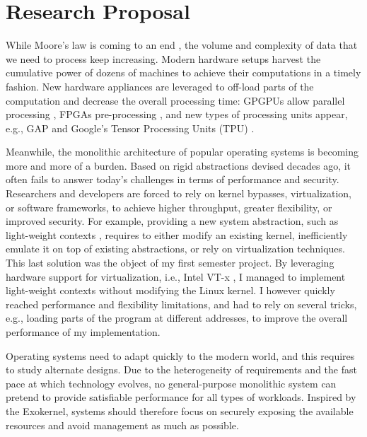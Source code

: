 \section{Research Proposal}

While Moore's law is coming to an end \cite{DBLP:journals/cse/TheisW17,DBLP:journals/computer/DeBenedictis17}, the volume and complexity of data that we need to process keep increasing.
Modern hardware setups harvest the cumulative power of dozens of machines to achieve their computations in a timely fashion.
New hardware appliances are leveraged to off-load parts of the computation and decrease the overall processing time: GPGPUs allow parallel processing \cite{DBLP:journals/pvldb/YuanL013,DBLP:conf/damon/KaldeweyLMV12,DBLP:journals/pvldb/Ailamaki15}, FPGAs pre-processing \cite{DBLP:journals/cacm/PutnamCCCCDEFGG16}, and new types of processing units appear, e.g., GAP \cite{DARPAGAP} and Google's Tensor Processing Units (TPU) \cite{GoogleTPU}.

Meanwhile, the monolithic architecture of popular operating systems is becoming more and more of a burden.
Based on rigid abstractions devised decades ago, it often fails to answer today's challenges in terms of performance and security.
Researchers and developers are forced to rely on kernel bypasses, virtualization, or software frameworks, to achieve higher throughput, greater flexibility, or improved security.
For example, providing a new system abstraction, such as light-weight contexts \cite{DBLP:conf/osdi/LittonVE0BD16}, requires to either modify an existing kernel, inefficiently emulate it on top of existing abstractions, or rely on virtualization techniques.
This last solution was the object of my first semester project.
By leveraging hardware support for virtualization, i.e., Intel VT-x \cite{DBLP:journals/computer/UhligNRSMABKLS05}, I managed to implement light-weight contexts without modifying the Linux kernel.
I however quickly reached performance and flexibility limitations, and had to rely on several tricks, e.g., loading parts of the program at different addresses, to improve the overall performance of my implementation.

Operating systems need to adapt quickly to the modern world, and this requires to study alternate designs.
Due to the heterogeneity of requirements and the fast pace at which technology evolves, no general-purpose monolithic system can pretend to provide satisfiable performance for all types of workloads.
Inspired by the Exokernel, systems should therefore focus on securely exposing the available resources and avoid management as much as possible.

